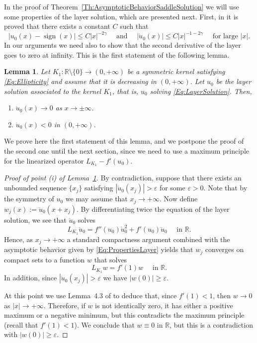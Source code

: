 \documentclass[12pt,reqno]{amsart}
\newtheorem{lemma}[theorem]{Lemma}
\theoremstyle{definition}
\theoremstyle{remark}
\newcommand{\con}[1]{\mathbb{#1}}
\newcommand{\R}{\con{R}} %
\newcommand{\s}{\gamma}
\DeclareMathOperator{\sign}{sign}
\numberwithin{equation}{section}
\begin{document}
In the proof of Theorem~\ref{Th:AsymptoticBehaviorSaddleSolution} we will use some properties of the layer solution, which are presented next. First, in \cite{CozziPassalacqua} it is proved that there exists a constant $C$ such that
\begin{equation}
\label{Eq:PropertiesLayer}
|u_0 (x)-\sign(x)| \leq C |x|^{-2\s}  \quad \text{ and } \quad |\dot{u}_0 (x)| \leq C |x|^{-1-2\s}  \quad \text{ for large }|x|.
\end{equation}
In our arguments we need also to show that the second derivative of the layer goes to zero at infinity. This is the first statement of the following lemma.

\begin{lemma}
	\label{Lemma:SecondDerivativeLayer}
	Let $K_1:\R \setminus \{0\} \to (0,+\infty)$ be a symmetric kernel satisfying \eqref{Eq:Ellipticity} and assume that it is decreasing in $(0,+\infty)$. Let $u_0$ be the layer solution associated to the kernel $K_1$, that is, $u_0$ solving \eqref{Eq:LayerSolution}. Then, 
	\begin{enumerate}[label=(\roman{*})]
		\item $\ddot{u}_0 (x) \to 0$ as $x\to \pm \infty$.	
		\item  $\ddot{u}_0 (x) < 0$ in $(0,+\infty)$.
	\end{enumerate}
\end{lemma}

We prove here the first statement of this lemma, and we postpone the proof of the second one until the next section, since we need to use a maximum principle for the linearized operator $L_{K_1} - f'(u_0)$.

\begin{proof}[Proof of point (i) of Lemma~\ref{Lemma:SecondDerivativeLayer}]
	By contradiction, suppose that there exists an unbounded sequence $\{x_j\}$ satisfying $|\ddot{u}_0(x_j)|>\varepsilon$ for some $\varepsilon>0$. Note that by the symmetry of $u_0$ we may assume that $x_j\to + \infty$. Now define $w_j (x) := \ddot{u}_0(x+x_j)$. By differentiating twice the equation of the layer solution, we see that $\ddot{u}_0$ solves
	$$
	L_{K_1} \ddot{u}_0 = f''(u_0)\dot{u}_0^2 + f'(u_0)\ddot{u}_0 \quad \text{ in }\R.
	$$
	Hence, as $x_j \to +\infty$ a standard compactness argument combined with the asymptotic behavior given by \eqref{Eq:PropertiesLayer} yields that $w_j$ converges on compact sets to a function $w$ that solves
	$$
	L_{K_1}  w = f'(1)w \quad \text{ in }\R.
	$$
	In addition, since $|\ddot{u}_0(x_j)|>\varepsilon$ we have $|w(0)|\geq \varepsilon$.
	
	At this point we use Lemma~4.3 of \cite{CozziPassalacqua} to deduce that, since $f'(1)<1$, then $w\to 0$ as $|x| \to +\infty$. Therefore, if $w$ is not identically zero, it has either a positive maximum or a negative minimum, but this contradicts the maximum principle (recall that $f'(1)<1$). We conclude that $w\equiv0$ in $\R$, but this is a contradiction with $|w(0)|\geq \varepsilon$.
\end{proof}
\end{document}

